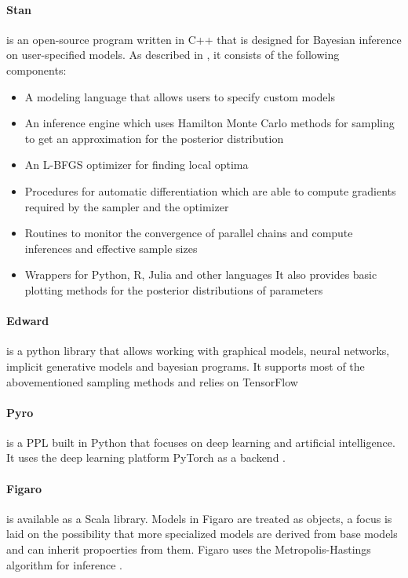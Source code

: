 \documentclass{article}
\begin{document}
\paragraph{Stan}
is an open-source program written in C++ that is designed for Bayesian inference on user-specified models. As described in \cite{Gelman_2015}, it consists of the following components:
\begin{itemize}
	\item A modeling language that allows users to specify custom models
	\item An inference engine which uses Hamilton Monte Carlo methods for sampling to get an approximation for the posterior distribution
	\item An L-BFGS optimizer for finding local optima
	\item Procedures for automatic differentiation which are able to compute gradients required by the sampler and the optimizer
	\item Routines to monitor the convergence of parallel chains and compute inferences and effective sample sizes
	\item Wrappers for Python, R, Julia and other languages
It also provides basic plotting methods for the posterior distributions of parameters
\end{itemize}
\paragraph{Edward}
is a python library that allows working with graphical models, neural networks, implicit generative models and bayesian programs. It supports most of the abovementioned sampling methods and relies on TensorFlow \cite{tran2016edward}
\paragraph{Pyro}
is a PPL built in Python that focuses on deep learning and artificial intelligence. It uses the deep learning platform PyTorch as a backend \cite{bingham2018pyro}.
\paragraph{Figaro}
is available as a Scala library. Models in Figaro are treated as objects, a focus is laid on the possibility that more specialized models are derived from base models and can inherit propoerties from them. Figaro uses the Metropolis-Hastings algorithm for inference \cite{pfeffer2009figaro}.
\end{document}
